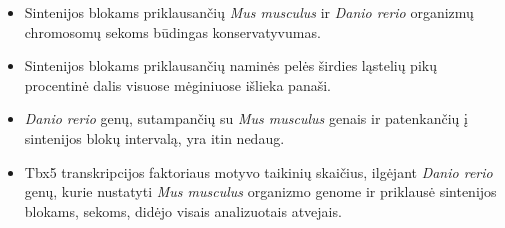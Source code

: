 \documentclass[12pt]{article}
\begin{document}
\begin{itemize}
    \item Sintenijos blokams priklausančių \emph{Mus musculus} ir
          \emph{Danio rerio} organizmų chromosomų sekoms būdingas
          konservatyvumas.
    \item Sintenijos blokams priklausančių naminės pelės širdies ląstelių pikų
          procentinė dalis visuose mėginiuose išlieka panaši.
    \item \emph{Danio rerio} genų, sutampančių su \emph{Mus musculus} genais ir
          patenkančių į sintenijos blokų intervalą, yra itin nedaug.
    \item Tbx5 transkripcijos faktoriaus motyvo taikinių skaičius, ilgėjant
          \emph{Danio rerio} genų, kurie nustatyti \emph{Mus musculus}
          organizmo genome ir priklausė sintenijos blokams, sekoms, didėjo
          visais analizuotais atvejais.
\end{itemize}

\newpage

\end{document}
